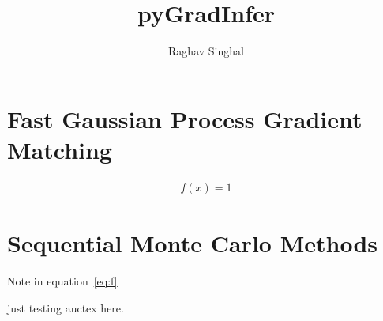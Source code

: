 \documentclass[12pt, letterpaper]{article}
\title{pyGradInfer}
\author{Raghav Singhal}
\begin{document}
\maketitle

\section{Fast Gaussian Process Gradient Matching}

\begin{align}
  \label{eq:f}
  f(x) = 1
\end{align}

\section{Sequential Monte Carlo Methods}

Note in equation~\ref{eq:f}

just testing auctex here.
\end{document}
